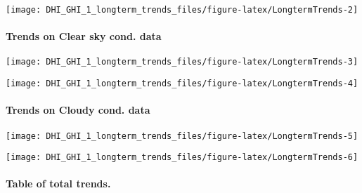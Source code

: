 \documentclass[
  10pt,
  a4paper,oneside]{article}
\begin{document}
\begin{center}\texttt{[image: DHI\_GHI\_1\_longterm\_trends\_files/figure-latex/LongtermTrends-2]} \end{center}

\newpage

\hypertarget{trends-on-clear-sky-cond.-data}{%
\paragraph{Trends on Clear sky cond. data}\label{trends-on-clear-sky-cond.-data}}

\begin{center}\texttt{[image: DHI\_GHI\_1\_longterm\_trends\_files/figure-latex/LongtermTrends-3]} \end{center}

\begin{center}\texttt{[image: DHI\_GHI\_1\_longterm\_trends\_files/figure-latex/LongtermTrends-4]} \end{center}

\newpage

\hypertarget{trends-on-cloudy-cond.-data}{%
\paragraph{Trends on Cloudy cond. data}\label{trends-on-cloudy-cond.-data}}

\begin{center}\texttt{[image: DHI\_GHI\_1\_longterm\_trends\_files/figure-latex/LongtermTrends-5]} \end{center}

\begin{center}\texttt{[image: DHI\_GHI\_1\_longterm\_trends\_files/figure-latex/LongtermTrends-6]} \end{center}

\newpage

\hypertarget{table-of-total-trends.}{%
\paragraph{Table of total trends.}\label{table-of-total-trends.}}

\scriptsize
\end{document}
